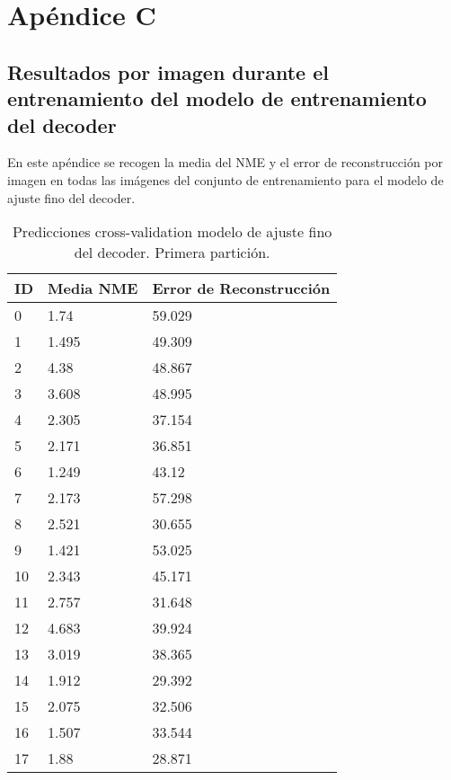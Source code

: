 
\chapter{Apéndice C}\label{ap:apendiceC}

\section*{Resultados por imagen durante el entrenamiento del modelo de entrenamiento del decoder}

En este apéndice se recogen la media del NME y el error de reconstrucción por imagen en todas las imágenes del conjunto de entrenamiento para el modelo de ajuste fino del decoder.

\begin{table}[!ht]
    \centering
    \caption{Predicciones cross-validation modelo de ajuste fino del decoder. Primera partición.}
    \begin{tabular}{|l|l|l|}
    \hline
    \cellcolor{gray!25}\textbf{ID} & \cellcolor{gray!25}\textbf{Media NME} & \cellcolor{gray!25}\textbf{Error de Reconstrucción} \\ \hline
        0 & 1.74 & 59.029 \\ \hline
        1 & 1.495 & 49.309 \\ \hline
        2 & 4.38 & 48.867 \\ \hline
        3 & 3.608 & 48.995 \\ \hline
        4 & 2.305 & 37.154 \\ \hline
        5 & 2.171 & 36.851 \\ \hline
        6 & 1.249 & 43.12 \\ \hline
        7 & 2.173 & 57.298 \\ \hline
        8 & 2.521 & 30.655 \\ \hline
        9 & 1.421 & 53.025 \\ \hline
        10 & 2.343 & 45.171 \\ \hline
        11 & 2.757 & 31.648 \\ \hline
        12 & 4.683 & 39.924 \\ \hline
        13 & 3.019 & 38.365 \\ \hline
        14 & 1.912 & 29.392 \\ \hline
        15 & 2.075 & 32.506 \\ \hline
        16 & 1.507 & 33.544 \\ \hline
        17 & 1.88 & 28.871 \\ \hline

\end{tabular}
\end{table}
